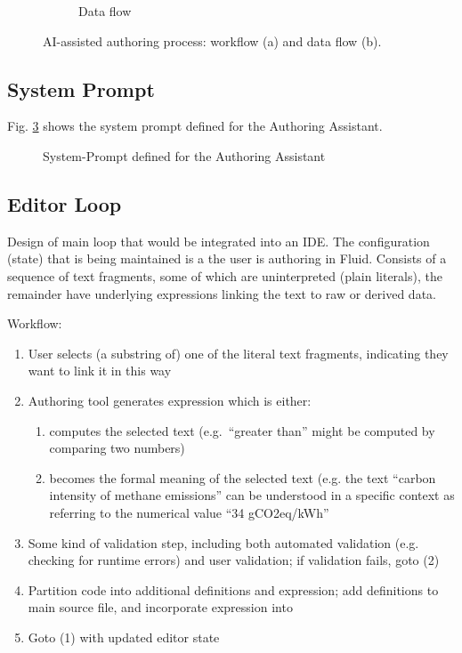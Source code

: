 \begin{figure}[ht]
\begin{subfigure}{0.48\linewidth}
        \caption{Data flow}
        \label{fig:dataflow}
    \end{subfigure}
    \caption{AI-assisted authoring process: workflow (a) and data flow (b).}
    \label{fig:overall}
\end{figure}


\subsection{System Prompt}
\label{subsec:system-prompt}
Fig. \ref{fig:system-prompt} shows the system prompt defined for the Authoring Assistant.

\begin{figure}[h]
    \centering
    \begin{tcolorbox}[colback=gray!10, colframe=gray!50, boxrule=0.5pt, arc=2pt,
        left=6pt, right=6pt, top=4pt, bottom=4pt]
    \end{tcolorbox}
    \vspace{-0.5em}
    \caption{System-Prompt defined for the Authoring Assistant}
    \label{fig:system-prompt}
\end{figure}


\subsection{Editor Loop}
\label{subsec:editor-loop}
Design of main loop that would be integrated into an IDE. The configuration (state) that is being maintained
is a  the user is authoring in Fluid. Consists of a sequence of text fragments, some of which
are uninterpreted (plain literals), the remainder have underlying expressions linking the text to raw or derived
data.

Workflow:
\begin{enumerate}
\item User selects (a substring of) one of the literal text fragments, indicating they want to link it in this
way
\item Authoring tool generates expression which is either:
  \begin{enumerate}
  \item computes the selected text (e.g.~``greater than'' might be computed by comparing two numbers)
  \item becomes the formal meaning of the selected text (e.g. the text ``carbon intensity of methane
emissions'' can be understood in a specific context as referring to the numerical value ``34 gCO2eq/kWh''
  \end{enumerate}
\item Some kind of validation step, including both automated validation (e.g. checking for runtime errors) and
user validation; if validation fails, goto (2)
\item Partition code into additional definitions and expression; add definitions to main source file, and
incorporate expression into 
\item Goto (1) with updated editor state
\end{enumerate}

